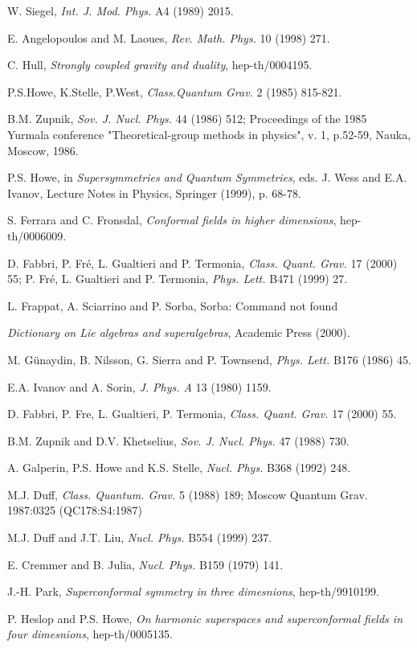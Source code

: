 \documentclass[a4paper,12pt]{article}
\begin{document}
\begin{thebibliography}{99}
 W. Siegel, {\it Int. J. Mod. Phys.} A4 
(1989) 2015. 

 E. Angelopoulos and M. Laoues, {\it Rev. Math. Phys.} 10 (1998) 271.

 C. Hull, {\it  Strongly coupled gravity and 
duality}, hep-th/0004195.  

P.S.Howe, K.Stelle, P.West,  {\it Class.Quantum Grav.} 2 (1985) 
815-821. 

 B.M. Zupnik, {\it Sov. J. Nucl. Phys.} 44 (1986) 512; 
Proceedings of the 1985 Yurmala conference "Theoretical-group 
methods in physics", v. 1, p.52-59, Nauka, Moscow, 1986. 

 P.S. Howe, in {\it Supersymmetries and Quantum 
Symmetries}, eds. J. Wess and E.A. Ivanov, Lecture Notes in 
Physics, Springer (1999), p. 68-78. 

 S. Ferrara and C. Fronsdal, {\it Conformal fields in 
higher dimensions}, hep-th/0006009. 

 D. Fabbri, P. Fr\'e, L. Gualtieri and P. Termonia, {\it Class. Quant. Grav.} 17 (2000) 55; P. Fr\'e, L. Gualtieri and P. Termonia, {\it Phys. Lett.} B471 (1999) 27.

 L. Frappat, A. Sciarrino and P. Sorba, 
Sorba: Command not found

{\it Dictionary on Lie algebras and superalgebras}, Academic Press 
(2000). 

 M. G\"unaydin, B. Nilsson, G. Sierra and P. 
Townsend, {\it  Phys. Lett.} B176 (1986) 45. 

 E.A. Ivanov and A. Sorin, {\it  J. Phys. A}  {13} (1980) 
1159. 

 D. Fabbri, P. Fre, L. Gualtieri, P. Termonia, 
{\it  Class. Quant. Grav.} 17 (2000) 55. 

 B.M. Zupnik and D.V. Khetselius,  {\it  Sov. J. Nucl. Phys.} 47  
(1988) 730. 

 A. Galperin, P.S. Howe and K.S. Stelle, {\it Nucl. Phys.}
 B368 (1992) 248.


 M.J. Duff, {\it Class. Quantum.  Grav.}
5 (1988) 189; Moscow Quantum Grav. 1987:0325 (QC178:S4:1987) 

 M.J. Duff and J.T. Liu, {\it Nucl. Phys.}
 B554 (1999) 237.

 E. Cremmer and B. Julia, {\it Nucl. Phys.}
 B159 (1979) 141.

 J.-H. Park, {\it Superconformal symmetry in three 
dimesnions}, hep-th/9910199.

 P. Heslop and P.S. Howe, 
{\it On harmonic superspaces and superconformal fields in four 
dimesnions}, hep-th/0005135. 



\end{thebibliography}
\end{document}
